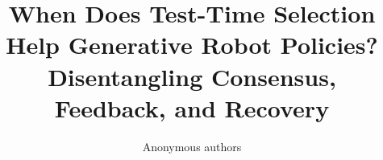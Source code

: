 \usepackage[T1]{fontenc}
\usepackage{amsmath,amssymb,graphicx,booktabs,array,url}
\graphicspath{{figures/}}
\newcommand{\R}{\mathbb{R}}
\newcommand{\ind}{\mathbf{1}}
\DeclareMathOperator*{\argmin}{arg\,min}
\DeclareMathOperator*{\argmax}{arg\,max}
\title{When Does Test-Time Selection Help Generative Robot Policies?\\Disentangling Consensus, Feedback, and Recovery}
\author{Anonymous authors}

